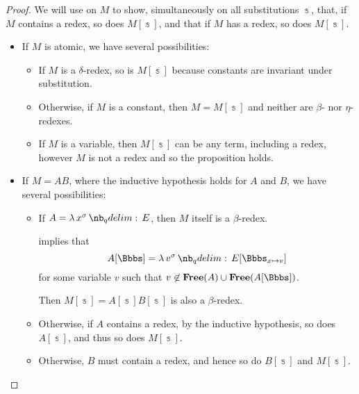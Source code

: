 \begin{proof}
   We will use  on \( M \) to show, simultaneously on all substitutions \( \Bbbs \), that, if \( M \) contains a redex, so does \( M[\Bbbs] \), and that if \( M \) has a redex, so does \( M[\Bbbs] \).

  \begin{itemize}
    \item If \( M \) is atomic, we have several possibilities:
    \begin{itemize}
      \item If \( M \) is a \( \delta \)-redex, so is \( M[\Bbbs] \) because constants are invariant under substitution.

      \item Otherwise, if \( M \) is a constant, then \( M = M[\Bbbs] \) and neither are \( \beta \)- nor \( \eta \)-redexes.

      \item If \( M \) is a variable, then \( M[\Bbbs] \) can be any term, including a redex, however \( M \) is not a redex and so the proposition holds.
    \end{itemize}

    \item If \( M = AB \), where the inductive hypothesis holds for \( A \) and \( B \), we have several possibilities:
    \begin{itemize}
      \item If \( A = \qabs {x^\sigma} E \), then \( M \) itself is a \( \beta \)-redex.

       implies that
      \begin{equation*}
        A[\Bbbs] = \qabs {v^\sigma} E[\Bbbs_{x \mapsto v}]
      \end{equation*}
      for some variable \( v \) such that \( v \not\in \op*{Free}(A) \cup \op*{Free}(A[\Bbbs]) \).

      Then \( M[\Bbbs] = A[\Bbbs] B[\Bbbs] \) is also a \( \beta \)-redex.

      \item Otherwise, if \( A \) contains a redex, by the inductive hypothesis, so does \( A[\Bbbs] \), and thus so does \( M[\Bbbs] \).

      \item Otherwise, \( B \) must contain a redex, and hence so do \( B[\Bbbs] \) and \( M[\Bbbs] \).
    \end{itemize}


\end{itemize}
\end{proof}
